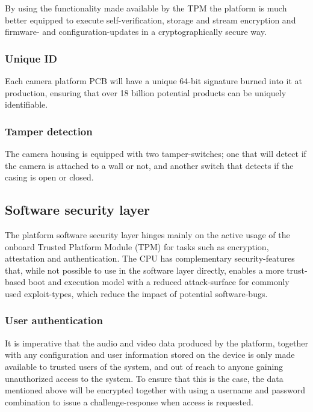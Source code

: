 \documentclass[10pt]{article}
\begin{document}
        By using the functionality made available by the TPM the platform is
        much better equipped to execute self-verification, storage and stream
        encryption and firmware- and configuration-updates in a cryptographically
        secure way.

      \subsubsection{Unique ID}

        Each camera platform PCB will have a unique 64-bit signature burned
        into it at production, ensuring that over 18 billion potential products
        can be uniquely identifiable.

      \subsubsection{Tamper detection}

        The camera housing is equipped with two tamper-switches; one that
        will detect if the camera is attached to a wall or not, and another
        switch that detects if the casing is open or closed.

    \subsection{Software security layer}

      The platform software security layer hinges mainly on the active usage of
      the onboard Trusted Platform Module (TPM) for tasks such as encryption,
      attestation and authentication. The CPU has complementary
      security-features that, while not possible to use in the software layer
      directly, enables a more trust-based boot and execution model with a
      reduced attack-surface for commonly used exploit-types, which reduce the
      impact of potential software-bugs.

      \subsubsection{User authentication}

        It is imperative that the audio and video data produced by the
        platform, together with any configuration and user information stored
        on the device is only made available to trusted users of the system,
        and out of reach to anyone gaining unauthorized access to the system.
        To ensure that this is the case, the data mentioned above will be
        encrypted together with using a username and password combination to
        issue a challenge-response when access is requested.
\end{document}
